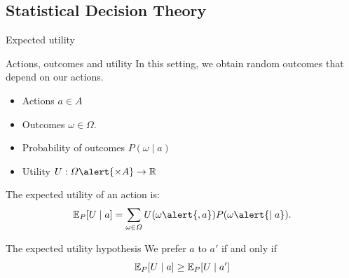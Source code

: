 \documentclass[smaller]{beamer}
\begin{document}
\subsection{Statistical Decision Theory}
\label{sec:org7cac62a}

\begin{frame}[label={sec:org19222b3}]{Expected utility}
\begin{block}{Actions, outcomes and utility}
In this setting, we obtain random outcomes that depend on our actions.
\begin{itemize}
\item Actions \(a \in A\)
\item Outcomes \(\omega \in \Omega\).
\item Probability of outcomes \(P(\omega \mid a)\)
\item Utility \(U : \Omega \alert{\times A} \to \Reals\)
\end{itemize}
\end{block}
\begin{definition}
The expected utility of an action is:
\[
\E_P[U \mid a] = \sum_{\omega \in \Omega} U(\omega \alert{, a}) P(\omega \alert{\mid a}).
\]
\end{definition}

\begin{alertblock}{The expected utility hypothesis}
We prefer \(a\) to \(a'\) if and only if
\[
\mathop{\mbox{\ensuremath{\mathbb{E}}}}\nolimits_P[U \mid a] \geq \mathop{\mbox{\ensuremath{\mathbb{E}}}}\nolimits_P[U \mid a']
\]
\end{alertblock}
\end{frame}
\end{document}
